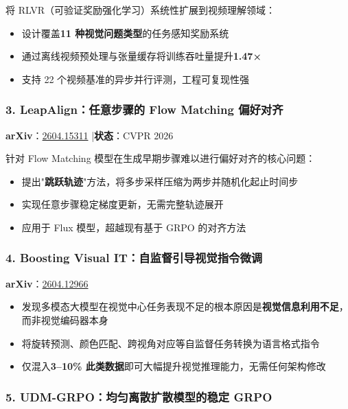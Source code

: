 将 RLVR（可验证奖励强化学习）系统性扩展到视频理解领域：

\begin{itemize}[leftmargin=1.5em]
  \item 设计覆盖\textbf{11 种视觉问题类型}的任务感知奖励系统
  \item 通过离线视频预处理与张量缓存将训练吞吐量提升\textbf{1.47×}
  \item 支持 22 个视频基准的异步并行评测，工程可复现性强
\end{itemize}

\subsubsection{3. LeapAlign：任意步骤的 Flow Matching 偏好对齐}

\textbf{arXiv}：\href{https://arxiv.org/abs/2604.15311}{2604.15311} |\textbf{状态}：CVPR 2026

针对 Flow Matching 模型在生成早期步骤难以进行偏好对齐的核心问题：

\begin{itemize}[leftmargin=1.5em]
  \item 提出"\textbf{跳跃轨迹}"方法，将多步采样压缩为两步并随机化起止时间步
  \item 实现任意步骤稳定梯度更新，无需完整轨迹展开
  \item 应用于 Flux 模型，超越现有基于 GRPO 的对齐方法
\end{itemize}

\subsubsection{4. Boosting Visual IT：自监督引导视觉指令微调}

\textbf{arXiv}：\href{https://arxiv.org/abs/2604.12966}{2604.12966}

\begin{itemize}[leftmargin=1.5em]
  \item 发现多模态大模型在视觉中心任务表现不足的根本原因是\textbf{视觉信息利用不足}，而非视觉编码器本身
  \item 将旋转预测、颜色匹配、跨视角对应等自监督任务转换为语言格式指令
  \item 仅混入\textbf{3–10\% 此类数据}即可大幅提升视觉推理能力，无需任何架构修改
\end{itemize}

\subsubsection{5. UDM-GRPO：均匀离散扩散模型的稳定 GRPO}

